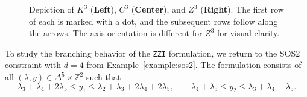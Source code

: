 \documentclass[opre,nonblindrev]{informs3} %
\newcommand{\blue}[1]{{#1}}
\newcommand{\bbZ}{\mathbb{Z}}
\newcommand{\ZZI}{\texttt{ZZI}}
\newcommand{\LogIB}{\texttt{LogIB}}
\begin{document}
\begin{figure}[htpb]
    \caption{Depiction of $K^3$ (\textbf{Left}), $C^3$ (\textbf{Center}), and $Z^3$ (\textbf{Right}). The first row of each is marked with a dot, and the subsequent rows follow along the arrows. The axis orientation is different for $Z^3$ for visual clarity.}
    \label{fig:encodings}
\end{figure}



To study the branching behavior of the \ZZI{} formulation, we return to the SOS2 constraint with $d=4$ from Example~\ref{example:sos2}. The formulation consists of all $(\lambda,y) \in \Delta^5 \times \bbZ^2$ such that
\begin{equation} \label{eqn:zigzag-example}
    \lambda_3 + \lambda_4 + 2 \lambda_5 \leq y_1 \leq \lambda_2 + \lambda_3 + 2\lambda_4 + 2\lambda_5, \quad\quad \lambda_4 + \lambda_5 \leq y_2 \leq \lambda_3 + \lambda_4 + \lambda_5.
\end{equation}
\end{document}
